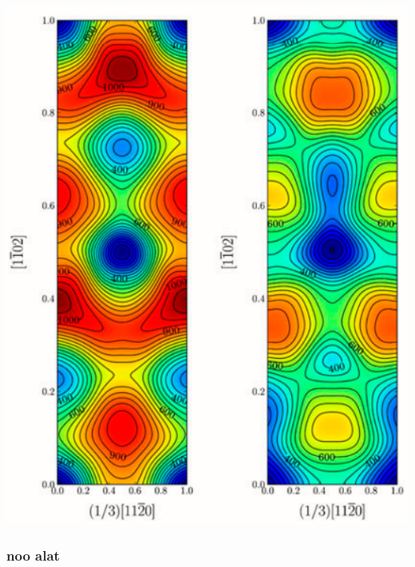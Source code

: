 \documentclass[11pt]{article}
\begin{document}
\begin{center}
\includegraphics[width=.9\linewidth]{Images/pyramidal_gamma_surface_ready_data_both.png}
\end{center}

\subsubsection{noo alat}
\label{sec:org853269d}
\end{document}
